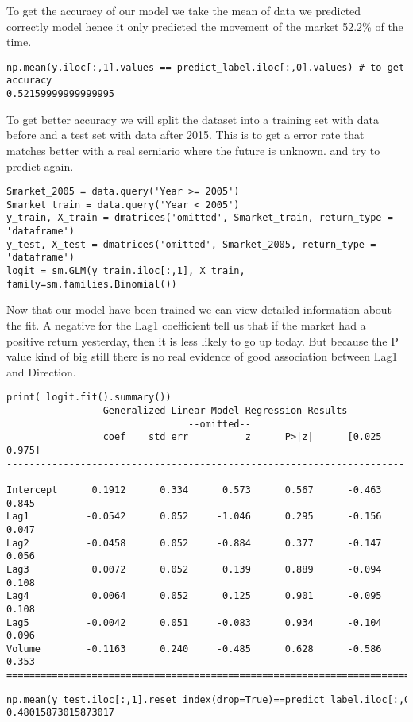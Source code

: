 To get the accuracy of our model we take the mean of data we predicted correctly model hence it only predicted the movement of the market 52.2\% of the time.
\begin{lstlisting}
np.mean(y.iloc[:,1].values == predict_label.iloc[:,0].values) # to get accuracy
0.52159999999999995
\end{lstlisting}
To get better accuracy we will split the dataset into a training set with data before and a test set with data after 2015. This is to get a error rate that matches better with a real serniario where the future is unknown. and try to predict again.

\begin{lstlisting}
Smarket_2005 = data.query('Year >= 2005')
Smarket_train = data.query('Year < 2005')
y_train, X_train = dmatrices('omitted', Smarket_train, return_type = 'dataframe')
y_test, X_test = dmatrices('omitted', Smarket_2005, return_type = 'dataframe')
logit = sm.GLM(y_train.iloc[:,1], X_train, family=sm.families.Binomial())
\end{lstlisting}

Now that our model have been trained we can view detailed information about the fit. A negative for the Lag1 coefficient tell us that if the market had a positive return yesterday, then it is less likely to go up today. But because the P value kind of big still there is no real evidence of good association between Lag1 and Direction.

\begin{lstlisting}
print( logit.fit().summary())
                 Generalized Linear Model Regression Results                  
								--omitted--
				 coef    std err          z      P>|z|      [0.025      0.975]
------------------------------------------------------------------------------
Intercept      0.1912      0.334      0.573      0.567      -0.463       0.845
Lag1          -0.0542      0.052     -1.046      0.295      -0.156       0.047
Lag2          -0.0458      0.052     -0.884      0.377      -0.147       0.056
Lag3           0.0072      0.052      0.139      0.889      -0.094       0.108
Lag4           0.0064      0.052      0.125      0.901      -0.095       0.108
Lag5          -0.0042      0.051     -0.083      0.934      -0.104       0.096
Volume        -0.1163      0.240     -0.485      0.628      -0.586       0.353
==============================================================================
\end{lstlisting}


\begin{lstlisting}
np.mean(y_test.iloc[:,1].reset_index(drop=True)==predict_label.iloc[:,0].reset_index(drop=True))
0.48015873015873017
\end{lstlisting}


